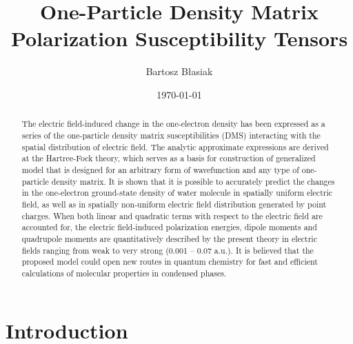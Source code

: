 \documentclass[aip,jcp,preprint,amsmath,amssymb,floatfix]{revtex4-1}
\begin{document}

\title{One-Particle Density Matrix Polarization Susceptibility Tensors}

\author{Bartosz B{\l}asiak}

\date{\today}

\begin{abstract}

The electric field\hyp{}induced change in the one\hyp{}electron density
has been expressed as a series of the one\hyp{}particle density matrix 
susceptibilities (DMS) interacting with the spatial distribution of electric field.
The analytic approximate expressions are derived at the Hartree\hyp{}Fock theory, 
which serves as a basis for construction of generalized model 
that is designed for an arbitrary form of wavefunction and any type of one\hyp{}particle density matrix.
It is shown that it is possible to accurately predict 
the changes in the one\hyp{}electron ground\hyp{}state density of water molecule 
in spatially uniform electric field, as well as in spatially non\hyp{}uniform 
electric field distribution generated by point charges. When both linear 
and quadratic terms with respect to the electric field are accounted for,
the electric field\hyp{}induced polarization energies, dipole moments 
and quadrupole moments are quantitatively described by the present theory 
in electric fields ranging from weak to very strong (0.001 -- 0.07 a.u.).
It is believed that the proposed model could open new routes in quantum chemistry 
for fast and efficient calculations of molecular properties in condensed phases.
\end{abstract}

\pacs{}%

\maketitle %

\section{\label{s:1}Introduction}
\end{document}
